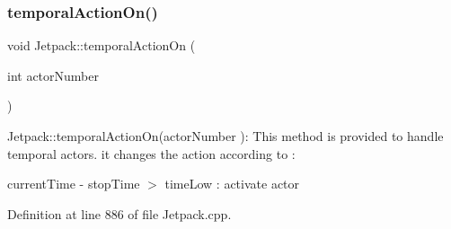 \subsubsection{\texorpdfstring{temporal\+Action\+On()}{temporalActionOn()}}
{\footnotesize\ttfamily void Jetpack\+::temporal\+Action\+On (\begin{DoxyParamCaption}\item[{int}]{actor\+Number }\end{DoxyParamCaption})}

Jetpack\+::temporal\+Action\+On(actor\+Number )\+: This method is provided to handle temporal actors. it changes the action according to \+:

current\+Time -\/ stop\+Time $>$ time\+Low \+: activate actor 

Definition at line 886 of file Jetpack.\+cpp.



